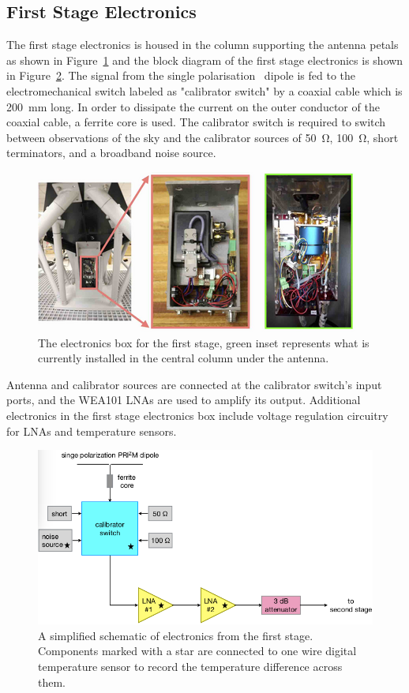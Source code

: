 \subsection{First Stage Electronics}

The first stage electronics is housed in the column supporting the antenna petals as shown in Figure~\ref{Fig:column} and the block diagram of the first stage electronics is shown in Figure~\ref{Fig:prizm_fee_block}. The signal from the single polarisation \prizm\ dipole is fed to the electromechanical switch labeled as "calibrator switch" by a coaxial cable which is \SI{200}{\milli \meter} long. In order to dissipate the current on the outer conductor of the coaxial cable, a ferrite core is used. The calibrator switch is required to switch between observations of the sky and the calibrator sources of \SI{50}{\ohm}, \SI{100}{\ohm}, short terminators, and a broadband noise source.

\begin{figure}
	\centering
	\includegraphics[width=0.7\linewidth]{Figures/column}
	\caption{The electronics box for the first stage, green inset represents what is currently installed in the central column under the antenna.}
	\label{Fig:column}
\end{figure}

Antenna and calibrator sources are connected at the calibrator switch's input ports, and the WEA101 LNAs are used to amplify its output. Additional electronics in the first stage electronics box include voltage regulation circuitry for LNAs and temperature sensors. 

\begin{figure}
	\centering
	\includegraphics[width=\linewidth]{Figures/prizm_fee_block}
	\caption{A simplified schematic of electronics from the first stage. Components marked with a star are connected to one wire digital temperature sensor to record the temperature difference across them.}
	\label{Fig:prizm_fee_block}
\end{figure}  

